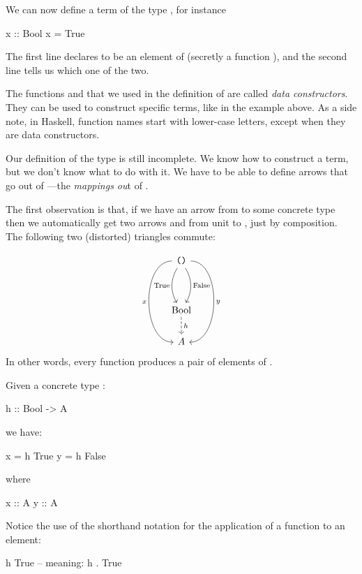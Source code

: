 \documentclass[DaoFP]{subfiles}
\begin{document}
We can now define a term of the type , for instance
\begin{haskell}
x :: Bool
x = True
\end{haskell}
The first line declares  to be an element of  (secretly a function ), and the second line tells us which one of the two.

The functions  and  that we used in the definition of  are called \emph{data constructors}. They can be used to construct specific terms, like in the example above. As a side note, in Haskell, function names start with lower-case letters, except when they are data constructors. 

Our definition of the type  is still incomplete. We know how to construct a  term, but we don't know what to do with it. We have to be able to define arrows that go out of ---the \emph{mappings ou}t of . 

The first observation is that, if we have an arrow  from  to some concrete type  then we automatically get two arrows  and  from unit to , just by composition. The following two (distorted) triangles commute:

\[
 \begin{tikzcd}
 \hask{()}
 \arrow[dd, bend right, "\text{True}"']
 \arrow[dd, bend left, "\text{False}"]
  \arrow[ddd, bend right =90, "x"']
 \arrow[ddd, bend left=90, "y"]
\\
 \\
\text{Bool}
\arrow[d, dashed, "h"]
\\
A
 \end{tikzcd}
\]
In other words, every function  produces a pair of elements of .

Given a concrete type :
\begin{haskell}
h :: Bool -> A
\end{haskell}
we have:
\begin{haskell}
x = h True
y = h False
\end{haskell}
where
\begin{haskell}
x :: A
y :: A
\end{haskell}
Notice the use of the shorthand notation for the application of a function to an element:
\begin{haskell}
h True -- meaning: h . True
\end{haskell}
\end{document}
